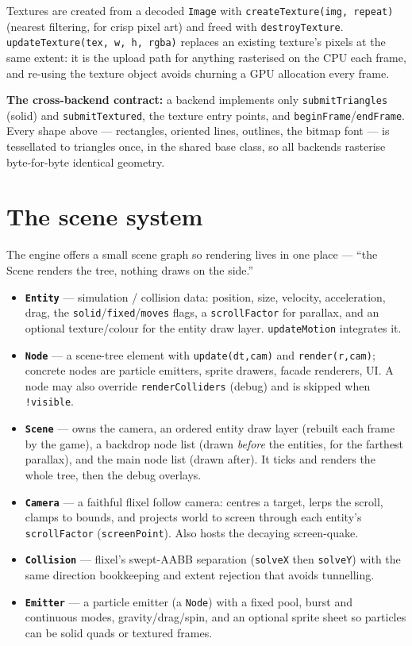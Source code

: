 \documentclass[11pt]{report}
\newcommand{\code}[1]{\texttt{#1}}
\begin{document}
\noindent Textures are created from a decoded \code{Image} with
\code{createTexture(img, repeat)} (nearest filtering, for crisp pixel art) and
freed with \code{destroyTexture}. \code{updateTexture(tex, w, h, rgba)} replaces
an existing texture's pixels at the same extent: it is the upload path for
anything rasterised on the CPU each frame, and re-using the texture object
avoids churning a GPU allocation every frame.

\textbf{The cross-backend contract:} a backend implements only
\code{submitTriangles} (solid) and \code{submitTextured}, the texture entry
points, and \code{beginFrame}/\code{endFrame}. Every shape above --- rectangles,
oriented lines, outlines, the bitmap font --- is tessellated to triangles once,
in the shared base class, so all backends rasterise byte-for-byte identical
geometry.

\chapter{The scene system}
The engine offers a small scene graph so rendering lives in one place ---
``the Scene renders the tree, nothing draws on the side.''

\begin{itemize}[nosep]
  \item \textbf{\code{Entity}} --- simulation / collision data: position, size,
        velocity, acceleration, drag, the \code{solid}/\code{fixed}/\code{moves}
        flags, a \code{scrollFactor} for parallax, and an optional texture/colour
        for the entity draw layer. \code{updateMotion} integrates it.
  \item \textbf{\code{Node}} --- a scene-tree element with \code{update(dt,cam)}
        and \code{render(r,cam)}; concrete nodes are particle emitters, sprite
        drawers, facade renderers, UI. A node may also override
        \code{renderColliders} (debug) and is skipped when \code{!visible}.
  \item \textbf{\code{Scene}} --- owns the camera, an ordered entity draw layer
        (rebuilt each frame by the game), a backdrop node list (drawn
        \emph{before} the entities, for the farthest parallax), and the main node
        list (drawn after). It ticks and renders the whole tree, then the debug
        overlays.
  \item \textbf{\code{Camera}} --- a faithful flixel follow camera: centres a
        target, lerps the scroll, clamps to bounds, and projects world to screen
        through each entity's \code{scrollFactor} (\code{screenPoint}). Also hosts
        the decaying screen-quake.
  \item \textbf{\code{Collision}} --- flixel's swept-AABB separation (\code{solveX}
        then \code{solveY}) with the same direction bookkeeping and extent
        rejection that avoids tunnelling.
  \item \textbf{\code{Emitter}} --- a particle emitter (a \code{Node}) with a
        fixed pool, burst and continuous modes, gravity/drag/spin, and an optional
        sprite sheet so particles can be solid quads or textured frames.
\end{itemize}
\end{document}
